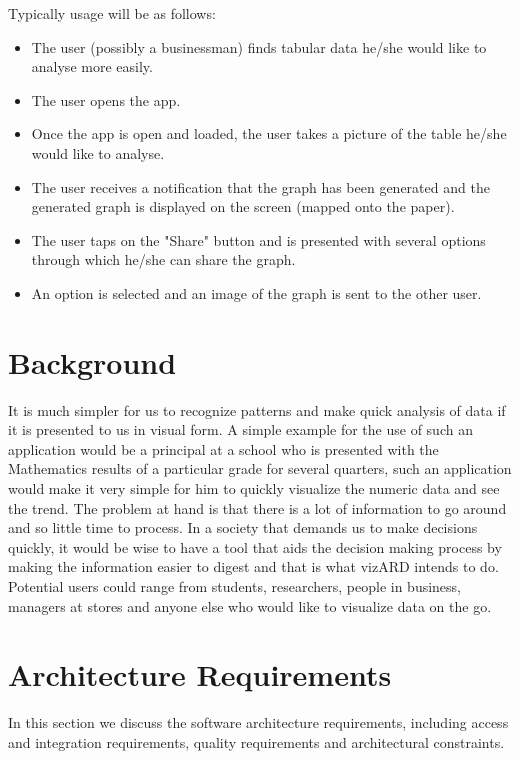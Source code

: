 \documentclass[a4paper,12pt]{article}
\begin{document}
Typically usage will be as follows:
\begin{itemize}
	\item The user (possibly a businessman) finds tabular data he/she would like to analyse more easily.
	\item The user opens the app.
	\item Once the app is open and loaded, the user takes a picture of the table he/she would like to analyse.
	\item The user receives a notification that the graph has been generated and the generated graph is displayed on the screen (mapped onto the paper).
	\item The user taps on the "Share" button and is presented with several options through which he/she can share the graph.
	\item An option is selected and an image of the graph is sent to the other user.
\end{itemize}

\newpage
\section{Background}

It is much simpler for us to recognize patterns and make quick analysis of data if it is presented to us in visual form. A simple example for the use of such an application would be a principal at a school who is presented with the Mathematics results of a particular grade for several quarters, such an application would make it very simple for him to quickly visualize the numeric data and see the trend.
\newline
\newline
The problem at hand is that there is a lot of information to go around and so little time to process. In a society that demands us to make decisions quickly, it would be wise to have a tool that aids the decision making process by making the information easier to digest and that is what vizARD intends to do.
\newline
\newline
Potential users could range from students, researchers, people in business, managers at stores and anyone else who would like to visualize data on the go.
		

\newpage
\section{Architecture Requirements}
In this section we discuss the software architecture requirements, including access and integration requirements, quality requirements and architectural constraints.
\end{document}
